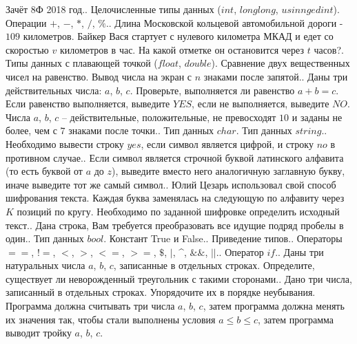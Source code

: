 \documentclass[a4paper,12pt]{article}
\begin{document}
Зачёт 8Ф 2018 год.. Целочисленные типы данных ($int$, $long long$, $usinnged int$). Операции $+$, $-$, $*$, $/$, $\%$.. Длина Московской кольцевой автомобильной дороги - $109$ километров. Байкер Вася стартует с нулевого километра МКАД и едет со скоростью $v$ километров в час. На какой отметке он остановится через $t$ часов?. Типы данных с плавающей точкой ($float$, $double$). Сравнение двух вещественных чисел на равенство. Вывод числа на экран с $n$ знаками после запятой.. Даны три действительных числа: $a$, $b$, $c$. Проверьте, выполняется ли равенство $a + b = c$. Если равенство выполняется, выведите $YES$, если не выполняется, выведите $NO$. Числа $a$, $b$, $c$ –  действительные, положительные, не превосходят $10$ и заданы не более, чем с $7$ знаками после точки.. Тип данных $char$. Тип данных $string$.. Необходимо вывести  строку $yes$, если символ является цифрой, и строку $no$ в противном случае.. Если символ является строчной буквой латинского алфавита (то есть буквой от $a$ до $z$), выведите вместо него аналогичную заглавную букву, иначе выведите тот же самый символ.. Юлий Цезарь использовал свой способ шифрования текста. Каждая буква заменялась на следующую по алфавиту через $K$ позиций по кругу. Необходимо по заданной шифровке определить исходный текст.. Дана строка, Вам требуется преобразовать все идущие подряд пробелы в один.. Тип данных $bool$. Констант True и False.. Приведение типов.. Операторы $==$, $!=$, $<$, $>$, $<=$, $>=$, $\$$, $|$, \textasciicircum, $\&\&$, $||$.. Оператор $if$.. Даны три натуральных числа $a$, $b$, $c$, записанные в отдельных строках. Определите, существует ли неворожденный треугольник с такими сторонами.. Дано три числа, записанный в отдельных строках. Упорядочите их в порядке неубывания. Программа должна считывать три числа $a$, $b$, $c$, затем программа должна менять их значения так, чтобы стали выполнены условия $a \le b \le c$, затем программа выводит тройку $a$, $b$, $c$.\newline
\end{document}
